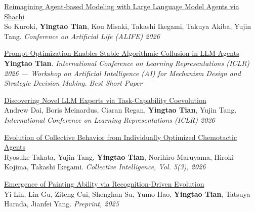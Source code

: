 \documentclass[line,margin]{cv}
\begin{document}
\begin{resume}
{  \begin{samepage}
  \href{https://arxiv.org/abs/2509.21862}{Reimagining Agent-based Modeling with Large Language Model Agents via Shachi}\\
  So Kuroki, \textbf{Yingtao Tian}, Kou Misaki, Takashi Ikegami, Takuya Akiba, Yujin Tang. \emph{Conference on Artificial Life (ALIFE) 2026}
  \par\end{samepage}

  \begin{samepage}
  \href{https://arxiv.org/abs/2604.17774}{Prompt Optimization Enables Stable Algorithmic Collusion in LLM Agents}\\
  \textbf{Yingtao Tian}. \emph{International Conference on Learning Representations (ICLR) 2026 --- Workshop on Artificial Intelligence (AI) for Mechanism Design and Strategic Decision Making. Best Short Paper}
  \par\end{samepage}

  \begin{samepage}
  \href{https://openreview.net/forum?id=efNINVs2So}{Discovering Novel LLM Experts via Task-Capability Coevolution}\\
  Andrew Dai, Boris Meinardus, Ciaran Regan, \textbf{Yingtao Tian}, Yujin Tang. \emph{International Conference on Learning Representations (ICLR) 2026}
  \par\end{samepage}

  \begin{samepage}
  \href{https://journals.sagepub.com/doi/10.1177/26339137261477746}{Evolution of Collective Behavior from Individually Optimized Chemotactic Agents}\\
  Ryosuke Takata, Yujin Tang, \textbf{Yingtao Tian}, Norihiro Maruyama, Hiroki Kojima, Takashi Ikegami. \emph{Collective Intelligence, Vol. 5(3), 2026}
  \par\end{samepage}

  \begin{samepage}
  \href{https://arxiv.org/abs/2501.04966}{Emergence of Painting Ability via Recognition-Driven Evolution}\\
  Yi Lin, Lin Gu, Ziteng Cui, Shenghan Su, Yumo Hao, \textbf{Yingtao Tian}, Tatsuya Harada, Jianfei Yang. \emph{Preprint, 2025}
  \par\end{samepage}

}
\end{resume}
\end{document}
